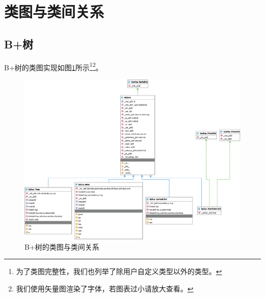 \documentclass[UTF8]{ctexrep} %
\begin{document}
\section{类图与类间关系}
\subsection{B+树}
B+树的类图实现如图\ref{fig:bplus_diagram}所示\footnote{为了类图完整性，我们也列举了除用户自定义类型以外的类型。}\footnote{我们使用矢量图渲染了字体，若图表过小请放大查看。}。
\begin{figure}[H]
    \centering
    \includegraphics[width=\linewidth]{figure/bplus.eps}
    \caption{B+树的类图与类间关系}
    \label{fig:bplus_diagram}
\end{figure}
\end{document}
